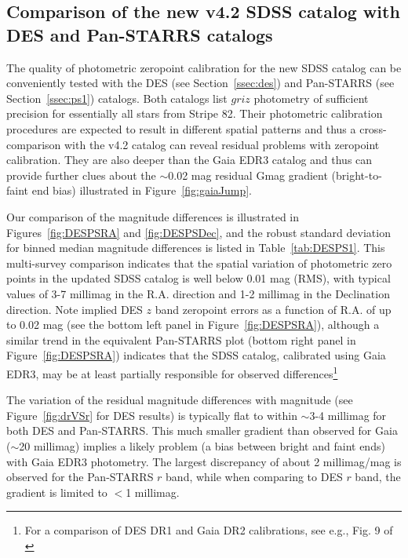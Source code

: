 \documentclass[fleqn,usenatbib]{mnras}
\begin{document}
  

\subsection{Comparison of the new v4.2 SDSS catalog with DES and Pan-STARRS catalogs \label{sec:DESPS1}} 
  
The quality of photometric zeropoint calibration for the new SDSS catalog can be conveniently
tested with the DES (see Section~\ref{ssec:des}) and Pan-STARRS (see Section~\ref{ssec:ps1}) catalogs. 
Both catalogs list $griz$ photometry of sufficient precision for essentially all stars
from Stripe 82. Their photometric calibration procedures are expected to result in different 
spatial patterns and thus a cross-comparison with the v4.2 catalog can reveal residual problems
with zeropoint calibration. They are also deeper than the Gaia EDR3 catalog and thus can provide
further clues about the $\sim$0.02 mag residual Gmag gradient (bright-to-faint end bias) 
illustrated in Figure~\ref{fig:gaiaJump}. 

Our comparison of the magnitude differences is illustrated in Figures~\ref{fig:DESPSRA} and \ref{fig:DESPSDec},
and the robust standard deviation for binned median magnitude differences is listed in Table~\ref{tab:DESPS1}. 
This multi-survey comparison indicates that the spatial variation of photometric zero points in the 
updated SDSS catalog is well below 0.01 mag (RMS), with typical values of 3-7 millimag in the R.A. 
direction and 1-2 millimag in the Declination direction. Note implied DES $z$ band zeropoint errors 
as a function of R.A. of up to 0.02 mag (see the bottom left panel in Figure~\ref{fig:DESPSRA}), although a 
similar trend in the equivalent Pan-STARRS plot (bottom right panel in Figure~\ref{fig:DESPSRA}) indicates 
that the SDSS catalog, calibrated using Gaia EDR3, may be at least partially responsible for observed 
differences\footnote{For a comparison of DES DR1 and Gaia DR2 calibrations, see e.g., Fig. 9 of \citet{2018ApJS..239...18A}}

The variation of the residual magnitude differences with magnitude (see Figure~\ref{fig:drVSr} for DES results) 
is typically flat to within $\sim$3-4 millimag for both DES and Pan-STARRS. This much smaller gradient than observed 
for Gaia ($\sim$20 millimag) implies a likely problem (a bias between bright and faint ends) with Gaia EDR3 
photometry. The largest discrepancy of about 2 millimag/mag is observed for the Pan-STARRS $r$ band, 
while when comparing to DES $r$ band, the gradient is limited to $<$1 millimag. 
\end{document}
